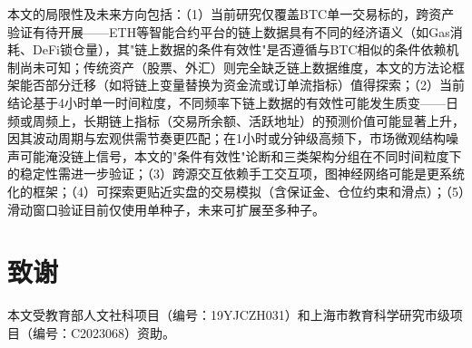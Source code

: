\documentclass[12pt,a4paper]{ctexart}
\begin{document}
本文的局限性及未来方向包括：（1）当前研究仅覆盖BTC单一交易标的，跨资产验证有待开展——ETH等智能合约平台的链上数据具有不同的经济语义（如Gas消耗、DeFi锁仓量），其"链上数据的条件有效性"是否遵循与BTC相似的条件依赖机制尚未可知；传统资产（股票、外汇）则完全缺乏链上数据维度，本文的方法论框架能否部分迁移（如将链上变量替换为资金流或订单流指标）值得探索；（2）当前结论基于4小时单一时间粒度，不同频率下链上数据的有效性可能发生质变——日频或周频上，长期链上指标（交易所余额、活跃地址）的预测价值可能显著上升，因其波动周期与宏观供需节奏更匹配；在1小时或分钟级高频下，市场微观结构噪声可能淹没链上信号，本文的"条件有效性"论断和三类架构分组在不同时间粒度下的稳定性需进一步验证；（3）跨源交互依赖手工交互项，图神经网络可能是更系统化的框架；（4）可探索更贴近实盘的交易模拟（含保证金、仓位约束和滑点）；（5）滑动窗口验证目前仅使用单种子，未来可扩展至多种子。

\newpage

\section*{致谢}
本文受教育部人文社科项目（编号：19YJCZH031）和上海市教育科学研究市级项目（编号：C2023068）资助。
\end{document}
